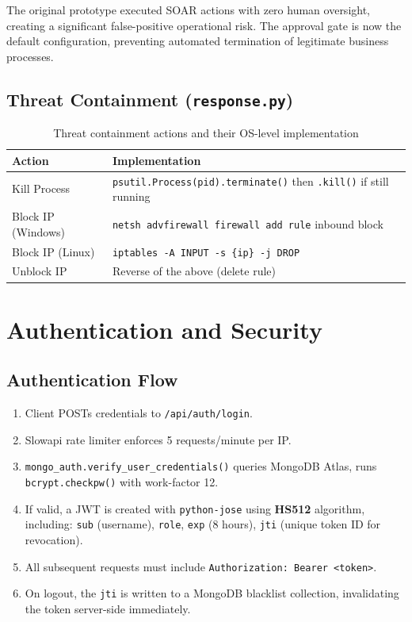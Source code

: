 \documentclass[12pt,a4paper]{article}
\begin{document}
\begin{successbox}
The original prototype executed SOAR actions with zero human oversight,
creating a significant false-positive operational risk. The approval gate is
now the default configuration, preventing automated termination of legitimate
business processes.
\end{successbox}

\subsection{Threat Containment (\texttt{response.py})}

\begin{table}[H]
\centering
\begin{tabularx}{\linewidth}{lX}
\toprule
\textbf{Action} & \textbf{Implementation} \\
\midrule
Kill Process & \texttt{psutil.Process(pid).terminate()} then \texttt{.kill()} if still running \\
Block IP (Windows) & \texttt{netsh advfirewall firewall add rule} inbound block \\
Block IP (Linux) & \texttt{iptables -A INPUT -s \{ip\} -j DROP} \\
Unblock IP & Reverse of the above (delete rule) \\
\bottomrule
\end{tabularx}
\caption{Threat containment actions and their OS-level implementation}
\end{table}

\section{Authentication and Security}

\subsection{Authentication Flow}

\begin{enumerate}[leftmargin=*]
    \item Client POSTs credentials to \texttt{/api/auth/login}.
    \item Slowapi rate limiter enforces 5 requests/minute per IP.
    \item \texttt{mongo\_auth.verify\_user\_credentials()} queries MongoDB Atlas,
          runs \texttt{bcrypt.checkpw()} with work-factor 12.
    \item If valid, a JWT is created with \texttt{python-jose} using \textbf{HS512}
          algorithm, including: \texttt{sub} (username), \texttt{role},
          \texttt{exp} (8 hours), \texttt{jti} (unique token ID for revocation).
    \item All subsequent requests must include \texttt{Authorization: Bearer <token>}.
    \item On logout, the \texttt{jti} is written to a MongoDB blacklist collection,
          invalidating the token server-side immediately.
\end{enumerate}
\end{document}
